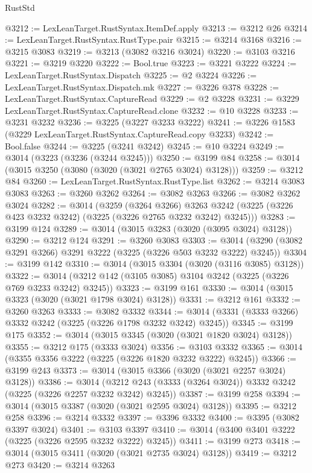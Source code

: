\begin{lexlean}{RustStd}
\begin{coremodule}
@3212 := LexLeanTarget.RustSyntax.ItemDef.apply
@3213 := @3212 @26
@3214 := LexLeanTarget.RustSyntax.RustType.pair
@3215 := @3214 @3168
@3216 := @3215 @3083
@3219 := @3213 (@3082 @3216 @3024)
@3220 := @3103 @3216
@3221 := @3219 @3220
@3222 := Bool.true
@3223 := @3221 @3222
@3224 := LexLeanTarget.RustSyntax.Dispatch
@3225 := @2 @3224
@3226 := LexLeanTarget.RustSyntax.Dispatch.mk
@3227 := @3226 @378
@3228 := LexLeanTarget.RustSyntax.CaptureRead
@3229 := @2 @3228
@3231 := @3229 LexLeanTarget.RustSyntax.CaptureRead.clone
@3232 := @10 @3228
@3233 := @3231 @3232
@3236 := @3225 (@3227 @3233 @3222)
@3241 := @3226 @1583 (@3229 LexLeanTarget.RustSyntax.CaptureRead.copy @3233)
@3242 := Bool.false
@3244 := @3225 (@3241 @3242)
@3245 := @10 @3224
@3249 := @3014 (@3223 (@3236 (@3244 @3245)))
@3250 := @3199 @84
@3258 := @3014 (@3015 @3250 (@3080 (@3020 (@3021 @2765 @3024) @3128)))
@3259 := @3212 @84
@3260 := LexLeanTarget.RustSyntax.RustType.list
@3262 := @3214 @3083 @3083
@3263 := @3260 @3262
@3264 := @3082 @3263
@3266 := @3082 @3262 @3024
@3282 := @3014
    (@3259
      (@3264 @3266)
      @3263
      @3242
      (@3225 (@3226 @423 @3232 @3242) (@3225 (@3226 @2765 @3232 @3242) @3245)))
@3283 := @3199 @124
@3289 := @3014 (@3015 @3283 (@3020 (@3095 @3024) @3128))
@3290 := @3212 @124
@3291 := @3260 @3083
@3303 := @3014 (@3290 (@3082 @3291 @3266) @3291 @3222 (@3225 (@3226 @503 @3232 @3222) @3245))
@3304 := @3199 @142
@3310 := @3014 (@3015 @3304 (@3020 (@3116 @3085) @3128))
@3322 := @3014 (@3212 @142 (@3105 @3085) @3104 @3242 (@3225 (@3226 @769 @3233 @3242) @3245))
@3323 := @3199 @161
@3330 := @3014 (@3015 @3323 (@3020 (@3021 @1798 @3024) @3128))
@3331 := @3212 @161
@3332 := @3260 @3263
@3333 := @3082 @3332
@3344 := @3014 (@3331 (@3333 @3266) @3332 @3242 (@3225 (@3226 @1798 @3232 @3242) @3245))
@3345 := @3199 @175
@3352 := @3014 (@3015 @3345 (@3020 (@3021 @1820 @3024) @3128))
@3355 := @3212 @175 (@3333 @3024)
@3356 := @3103 @3332
@3365 := @3014 (@3355 @3356 @3222 (@3225 (@3226 @1820 @3232 @3222) @3245))
@3366 := @3199 @243
@3373 := @3014 (@3015 @3366 (@3020 (@3021 @2257 @3024) @3128))
@3386 := @3014
    (@3212 @243 (@3333 (@3264 @3024)) @3332 @3242 (@3225 (@3226 @2257 @3232 @3242) @3245))
@3387 := @3199 @258
@3394 := @3014 (@3015 @3387 (@3020 (@3021 @2595 @3024) @3128))
@3395 := @3212 @258
@3396 := @3214 @3332
@3397 := @3396 @3332
@3400 := @3395 (@3082 @3397 @3024)
@3401 := @3103 @3397
@3410 := @3014 (@3400 @3401 @3222 (@3225 (@3226 @2595 @3232 @3222) @3245))
@3411 := @3199 @273
@3418 := @3014 (@3015 @3411 (@3020 (@3021 @2735 @3024) @3128))
@3419 := @3212 @273
@3420 := @3214 @3263

\end{coremodule}
\end{lexlean}
